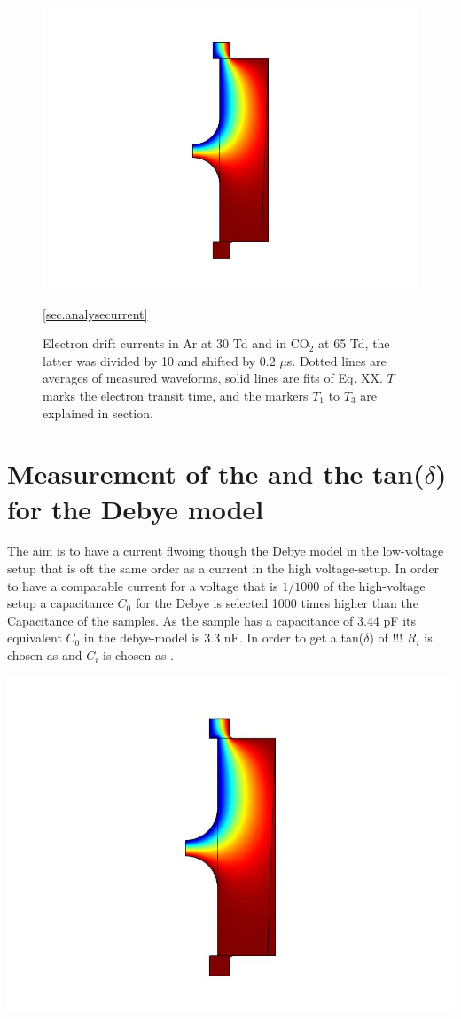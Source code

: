 \begin{figure}[htbp]
	\centering
	\includegraphics{figures/COMSOL_Beispielbild.jpg}		
	\caption[Kurze Abbildungsbeschreibung]{Electron drift currents in Ar at 30 Td and in CO$_2$ at 65 Td, the latter was divided by 10 and shifted by 0.2 $\mu$s. Dotted lines are averages of measured waveforms, solid lines are fits of Eq. XX. $T$ marks the electron transit time, and the markers $T_1$ to $T_3$ are explained in section.} \ref{sec.analysecurrent}
	\label{fig.waveforms}
\end{figure}

\section{Measurement of the \epsilon and the tan($\delta$) for the Debye model}
The aim is to have a current flwoing though the Debye model in the low-voltage setup that is oft the same order as a current in the high voltage-setup. In order to have a comparable current for a voltage that is $1/1000$ of the high-voltage setup a capacitance $C_0$ for the Debye is selected 1000 times higher than the Capacitance of the samples. As the sample has a capacitance of 3.44 pF its equivalent $C_0$ in the debye-model is 3.3 nF. In order to get a tan($\delta$) of !!! $R_i$ is chosen as and $C_i$ is chosen as .

\includegraphics{figures/COMSOL_Beispielbild.jpg}		
